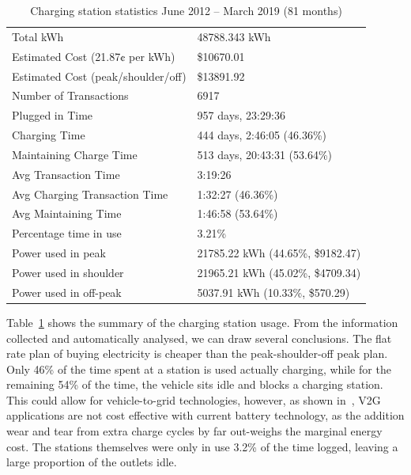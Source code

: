 \begin{table}[H]
	\centering
	\caption{Charging station statistics June 2012 – March 2019 (81 months)}
	\label{tbl:9:css}
	\begin{tabular}{ll}
		\toprule
		Total kWh                          & 48788.343 kWh                     \\
		Estimated Cost (21.87¢ per kWh)    & \$10670.01                        \\
		Estimated Cost (peak/shoulder/off) & \$13891.92                        \\
		Number of Transactions             & 6917                              \\
		Plugged in Time                    & 957 days, 23:29:36                \\
		Charging Time                      & 444 days, 2:46:05 (46.36\%)       \\
		Maintaining Charge Time            & 513 days, 20:43:31 (53.64\%)      \\
		Avg Transaction Time               & 3:19:26                           \\
		Avg Charging Transaction Time      & 1:32:27 (46.36\%)                 \\
		Avg Maintaining Time               & 1:46:58 (53.64\%)                 \\
		Percentage time in use             & 3.21\%                            \\
		Power used in peak                 & 21785.22 kWh (44.65\%, \$9182.47) \\
		Power used in shoulder             & 21965.21 kWh (45.02\%, \$4709.34) \\
		Power used in off-peak             & 5037.91 kWh (10.33\%, \$570.29)   \\ \bottomrule
	\end{tabular}
\end{table}

Table~\ref{tbl:9:css} shows the summary of the charging station usage. From the information collected and automatically analysed, we can draw several conclusions. The flat rate plan of buying electricity is cheaper than the peak-shoulder-off peak plan. Only 46\% of the time spent at a station is used actually charging, while for the remaining 54\% of the time, the vehicle sits idle and blocks a charging station. This could allow for vehicle-to-grid technologies, however, as shown in~\cite{mullan_technical_2012}, V2G applications are not cost effective with current battery technology, as the addition wear and tear from extra charge cycles by far out-weighs the marginal energy cost. The stations themselves were only in use 3.2\% of the time logged, leaving a large proportion of the outlets idle. 


